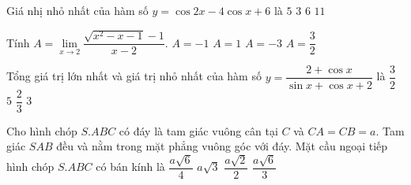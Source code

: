 \begin{ex}%
Giá nhị nhỏ nhất của hàm số $y=\cos 2x-4\cos x+6$ là
\choice
{$5$}
{\True $3$}
{$6$}
{$11$}
\end{ex}
\begin{ex}%
Tính $A=\displaystyle\lim\limits_{x\to 2}\dfrac{\sqrt{x^2-x-1}-1}{x-2}$.
\choice
{$A=-1$}
{$A=1$}
{$A=-3$}
{\True $A=\dfrac{3}{2}$}
\end{ex}
\begin{ex}%
Tổng giá trị lớn nhất và giá trị nhỏ nhất của hàm số $y=\dfrac{2+\cos x}{\sin x+\cos x +2}$ là
\choice
{$\dfrac{3}{2}$}
{$5$}
{$\dfrac{2}{3}$}
{\True $3$}
\end{ex}
\begin{ex}%
Cho hình chóp $S.ABC$ có đáy là tam giác vuông cân tại $C$ và $CA=CB=a$. Tam giác $SAB$ đều và nằm trong mặt phẳng vuông góc với đáy. Mặt cầu ngoại tiếp hình chóp $S.ABC$ có bán kính là
\choice
{$\dfrac{a\sqrt{6}}{4}$}
{$a\sqrt{3}$}
{$\dfrac{a\sqrt{2}}{2}$}
{\True $\dfrac{a\sqrt{6}}{3}$}
\end{ex}
